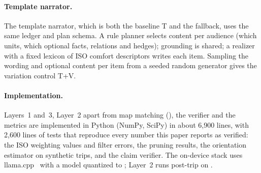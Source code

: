 \paragraph{Template narrator.}
The template narrator, which is both the baseline T and the fallback, uses the same ledger and plan schema.
A rule planner selects content per audience (which units, which optional facts, relations and hedges); grounding is shared; a realizer with a fixed lexicon of ISO comfort descriptors writes each item.
Sampling the wording and optional content per item from a seeded random generator gives the variation control T+V.

\paragraph{Implementation.}
Layers~1 and~3, Layer~2 apart from map matching (\TBD{}), the verifier and the metrics are implemented in Python (NumPy, SciPy) in about 6{,}900 lines, with 2{,}600 lines of tests that reproduce every number this paper reports as verified: the ISO weighting values and filter errors, the pruning results, the orientation estimator on synthetic trips, and the claim verifier.
The on-device stack uses llama.cpp~\cite{ggerganov_llamacpp} with a \TBD{} model quantized to \TBD{}; Layer~2 runs post-trip on \TBD{}.

